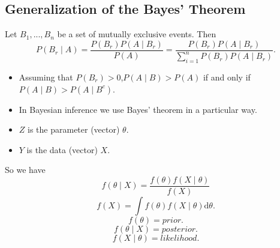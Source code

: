 \documentclass[lecture,12pt,]{pcms-l}
\numberwithin{section}{chapter}
\numberwithin{equation}{chapter}
\theoremstyle{plain}
\theoremstyle{definition}
\theoremstyle{definition}
\begin{document}
\subsection{Generalization of the Bayes' Theorem}
Let $B_1,...,B_n$ be a set of mutually exclusive events. Then
\begin{equation}
P(B_r\mid A)=\frac{P(B_r)P(A\mid B_r)}{P(A)}=\frac{P(B_r)P(A\mid B_r)}{\sum_{i=1}^n P(B_r)P(A\mid B_r)}.
\end{equation}
\begin{itemize}
\item Assuming that $P(B_r)>0$,$P(A\mid B)>P(A)$ if and only if $P(A\mid B)>P(A\mid B^c)$.
\item In Bayesian inference we use Bayes' theorem in a particular way.
\item $Z$ is the parameter (vector) $\theta$.
\item $Y$ is the data (vector) $X$.
\end{itemize}
So we have 
\begin{equation}
f(\theta\mid X)=\frac{f(\theta)f(X\mid \theta)}{f(X)}
\end{equation}
\begin{equation}
f(X)=\int f(\theta)f(X\mid \theta)\mathrm{d}\theta.
\end{equation}
\begin{equation}
f(\theta)=prior.
\end{equation}
\begin{equation}
f(\theta\mid X)=posterior.
\end{equation}
\begin{equation}
f(X\mid \theta)=likelihood.
\end{equation}
\end{document}
